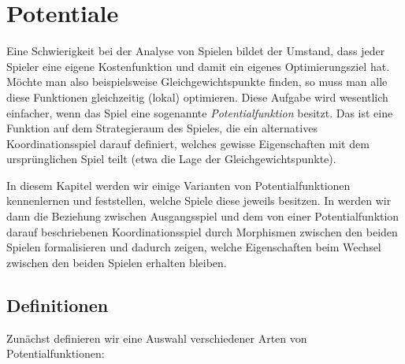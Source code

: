 \section{Potentiale}\label{sec:Potentiale}

Eine Schwierigkeit bei der Analyse von Spielen bildet der Umstand, dass jeder Spieler eine eigene Kostenfunktion und damit ein eigenes Optimierungsziel hat. Möchte man also beispielsweise Gleichgewichtspunkte finden, so muss man alle diese Funktionen gleichzeitig (lokal) optimieren. Diese Aufgabe wird wesentlich einfacher, wenn das Spiel eine sogenannte \emph{Potentialfunktion} besitzt. Das ist eine Funktion auf dem Strategieraum des Spieles, die ein alternatives Koordinationsspiel darauf definiert, welches gewisse Eigenschaften mit dem ursprünglichen Spiel teilt (etwa die Lage der Gleichgewichtspunkte).

In diesem Kapitel werden wir einige Varianten von Potentialfunktionen kennenlernen und feststellen, welche Spiele diese jeweils besitzen. In  werden wir dann die Beziehung zwischen Ausgangsspiel und dem von einer Potentialfunktion darauf beschriebenen Koordinationsspiel durch Morphismen zwischen den beiden Spielen formalisieren und dadurch zeigen, welche Eigenschaften beim Wechsel zwischen den beiden Spielen erhalten bleiben.

\subsection{Definitionen}

Zunächst definieren wir eine Auswahl verschiedener Arten von Potentialfunktionen:

